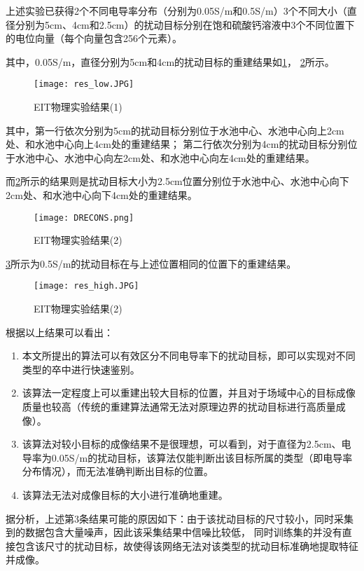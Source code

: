 上述实验已获得2个不同电导率分布（分别为0.05S/m和0.5S/m）3个不同大小（直径分别为5cm、4cm和2.5cm）的扰动目标分别在饱和硫酸钙溶液中3个不同位置下的电位向量（每个向量包含256个元素）。

其中，0.05S/m，直径分别为5cm和4cm的扰动目标的重建结果如\cref{figure:res_low}， \cref{figure:DRECONS}所示。
\begin{figure}[h]
    \centering
    \texttt{[image: res\_low.JPG]}
    \caption{EIT物理实验结果(1)}
    \label{figure:res_low}
\end{figure}
其中，第一行依次分别为5cm的扰动目标分别位于水池中心、水池中心向上2cm处、和水池中心向上4cm处的重建结果；
第二行依次分别为4cm的扰动目标分别位于水池中心、水池中心向左2cm处、和水池中心向左4cm处的重建结果。

而\cref{figure:DRECONS}所示的结果则是扰动目标大小为2.5cm位置分别位于水池中心、水池中心向下2cm处、和水池中心向下4cm处的重建结果。

\begin{figure}[h]
    \centering
    \texttt{[image: DRECONS.png]}
    \caption{EIT物理实验结果(2)}
    \label{figure:DRECONS}
\end{figure}

\cref{figure:res_high}所示为0.5S/m的扰动目标在与上述位置相同的位置下的重建结果。
\begin{figure}[h]
    \centering
    \texttt{[image: res\_high.JPG]}
    \caption{EIT物理实验结果(2)}
    \label{figure:res_high}
\end{figure}

根据以上结果可以看出：
\begin{enumerate}
    \item 本文所提出的算法可以有效区分不同电导率下的扰动目标，即可以实现对不同类型的卒中进行快速鉴别。
    \item 该算法一定程度上可以重建出较大目标的位置，并且对于场域中心的目标成像质量也较高（传统的重建算法通常无法对原理边界的扰动目标进行高质量成像）。
    \item 该算法对较小目标的成像结果不是很理想，可以看到，对于直径为2.5cm、电导率为0.05S/m的扰动目标，该算法仅能判断出该目标所属的类型（即电导率分布情况），而无法准确判断出目标的位置。
    \item 该算法无法对成像目标的大小进行准确地重建。
\end{enumerate}

据分析，上述第3条结果可能的原因如下：由于该扰动目标的尺寸较小，同时采集到的数据包含大量噪声，因此该采集结果中信噪比较低，
同时训练集的并没有直接包含该尺寸的扰动目标，故使得该网络无法对该类型的扰动目标准确地提取特征并成像。

